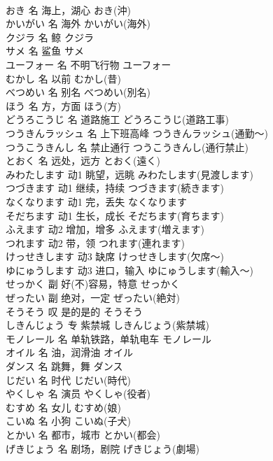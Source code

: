\documentclass[8pt]{extreport}
\begin{document}
\begin{CJK}{UTF8}{min}
\\	おき	名	海上，湖心	おき(沖)	
\\	かいがい	名	海外	かいがい(海外)	
\\	クジラ	名	鲸	クジラ	
\\	サメ	名	鲨鱼	サメ	
\\	ユーフォー	名	不明飞行物	ユーフォー
\\	むかし	名	以前	むかし(昔)	
\\	べつめい	名	别名	べつめい(別名)	
\\	ほう	名	方，方面	ほう(方)	
\\	どうろこうじ	名	道路施工	どうろこうじ(道路工事)	
\\	つうきんラッシュ	名	上下班高峰	つうきんラッシュ(通勤～)	
\\	つうこうきんし	名	禁止通行	つうこうきんし(通行禁止)	
\\	とおく	名	远处，远方	とおく(遠く)	
\\	みわたします	动1	眺望，远眺	みわたします(見渡します)	
\\	つづきます	动1	继续，持续	つづきます(続きます)	
\\	なくなります	动1	完，丢失	なくなります	
\\	そだちます	动1	生长，成长	そだちます(育ちます)	
\\	ふえます	动2	增加，增多	ふえます(増えます)	
\\	つれます	动2	带，领	つれます(連れます)	
\\	けっせきします	动3	缺席	けっせきします(欠席～)	
\\	ゆにゅうします	动3	进口，输入	ゆにゅうします(輸入～)	
\\	せっかく	副	好(不)容易，特意	せっかく	
\\	ぜったい	副	绝对，一定	ぜったい(絶対)	
\\	そうそう	叹	是的是的	そうそう	
\\	しきんじょう	专	紫禁城	しきんじょう(紫禁城)	
\\	モノレール	名	单轨铁路，单轨电车	モノレール	
\\	オイル	名	油，润滑油	オイル	
\\	ダンス	名	跳舞，舞	ダンス	
\\	じだい	名	时代	じだい(時代)	
\\	やくしゃ	名	演员	やくしゃ(役者)	
\\	むすめ	名	女儿	むすめ(娘)	
\\	こいぬ	名	小狗	こいぬ(子犬)	
\\	とかい	名	都市，城市	とかい(都会)	
\\	げきじょう	名	剧场，剧院	げきじょう(劇場)	

\end{CJK}
\end{document}

